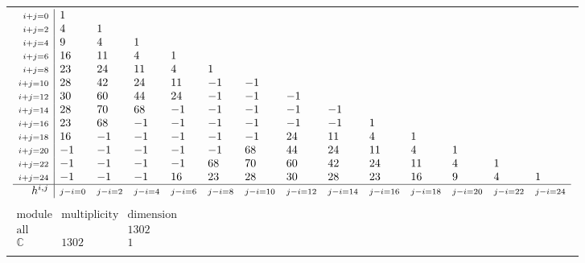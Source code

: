 \documentclass[crop,border=2mm]{standalone}
\begin{document}
\begin{tabular}{l}
$\displaystyle
\begin{array}{r|l l l l l l l l l l l l l}
	{\scriptstyle i+j=0}&1&&&&&&&&&&&&\\
	{\scriptstyle i+j=2}&4&1&&&&&&&&&&&\\
	{\scriptstyle i+j=4}&9&4&1&&&&&&&&&&\\
	{\scriptstyle i+j=6}&16&11&4&1&&&&&&&&&\\
	{\scriptstyle i+j=8}&23&24&11&4&1&&&&&&&&\\
	{\scriptstyle i+j=10}&28&42&24&11&-1&-1&&&&&&&\\
	{\scriptstyle i+j=12}&30&60&44&24&-1&-1&-1&&&&&&\\
	{\scriptstyle i+j=14}&28&70&68&-1&-1&-1&-1&-1&&&&&\\
	{\scriptstyle i+j=16}&23&68&-1&-1&-1&-1&-1&-1&1&&&&\\
	{\scriptstyle i+j=18}&16&-1&-1&-1&-1&-1&24&11&4&1&&&\\
	{\scriptstyle i+j=20}&-1&-1&-1&-1&-1&68&44&24&11&4&1&&\\
	{\scriptstyle i+j=22}&-1&-1&-1&-1&68&70&60&42&24&11&4&1&\\
	{\scriptstyle i+j=24}&-1&-1&-1&16&23&28&30&28&23&16&9&4&1\\
	\hline h^{i,j}&{\scriptstyle j-i=0}&{\scriptstyle j-i=2}&{\scriptstyle j-i=4}&{\scriptstyle j-i=6}&{\scriptstyle j-i=8}&{\scriptstyle j-i=10}&{\scriptstyle j-i=12}&{\scriptstyle j-i=14}&{\scriptstyle j-i=16}&{\scriptstyle j-i=18}&{\scriptstyle j-i=20}&{\scriptstyle j-i=22}&{\scriptstyle j-i=24}
\end{array}
$ \\ \\


$\displaystyle
\begin{array}{rll}
	\text{module}&\text{multiplicity}&\text{dimension} \\ \hline \text{all}&&1302 \\
	\mathbb{C}&1302&1
\end{array}
$ \\ \\

\end{tabular}
\end{document}

